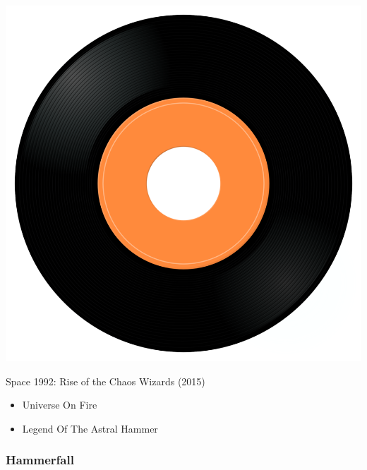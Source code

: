 \begin{minipage}[t]{0.25\textwidth}
\captionsetup{type=figure}
\includegraphics[width=\textwidth]{Images/cover.png}
\caption*{Space 1992: Rise of the Chaos Wizards (2015)}
\end{minipage}
\begin{minipage}[t]{0.25\textwidth}\vspace{0pt}
\begin{itemize}[nosep,leftmargin=1em,labelwidth=*,align=left]
	\setlength{\itemsep}{0pt}
	\item Universe On Fire
	\item Legend Of The Astral Hammer
\end{itemize}
\end{minipage}

\subsubsection{Hammerfall}

